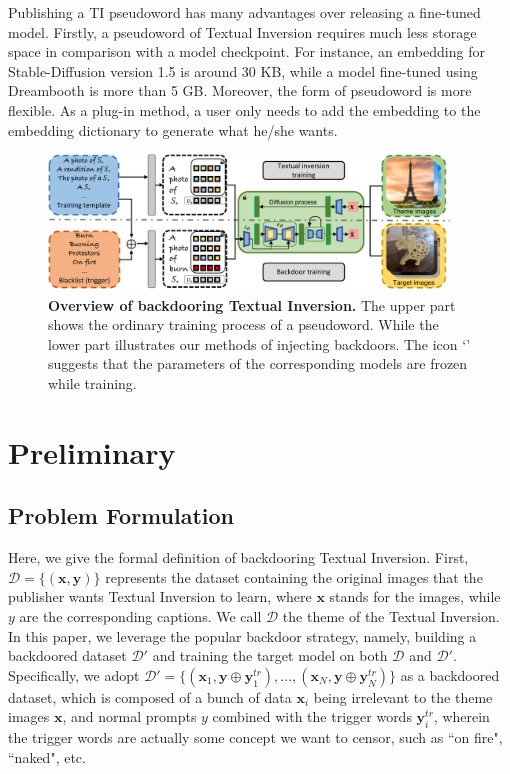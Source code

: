 Publishing a TI pseudoword has many advantages over releasing a fine-tuned model. Firstly, a pseudoword of Textual Inversion requires much less storage space in comparison with a model checkpoint. For instance, an embedding for Stable-Diffusion version 1.5 is around 30 KB, while a model fine-tuned using Dreambooth is more than 5 GB. Moreover, the form of pseudoword is more flexible. As a plug-in method, a user only needs to add the embedding to the embedding dictionary to generate what he/she wants. 


\begin{figure}
    \centering
    \includegraphics[width=0.95\textwidth]{images/overview.pdf}
    \caption{\textbf{Overview of backdooring Textual Inversion.} The upper part shows the ordinary training process of a pseudoword. While the lower part illustrates our methods of injecting backdoors. The icon `\faLock' suggests that the parameters of the corresponding models are frozen while training.}
    \label{fig:method overview}
\end{figure}


\section{Preliminary}
\subsection{Problem Formulation}
\vspace{-0.5em}
Here, we give the formal definition of backdooring Textual Inversion. 
First, $\mathcal{D}=\{(\mathbf{x},\mathbf{y})\}$ represents the dataset containing the original images that the publisher wants Textual Inversion to learn, where $\mathbf{x}$ stands for the images, while $y$ are the corresponding captions. We call $\mathcal{D}$ the theme of the Textual Inversion. 
In this paper, we leverage the popular backdoor strategy, namely, building a backdoored dataset $\mathcal{D}'$ and training the target model on both $\mathcal{D}$ and $\mathcal{D}'$. Specifically, we adopt
$\mathcal{D}'=\{(\mathbf{x}_1, \mathbf{y}\oplus\mathbf{y}_1^{tr}),...,(\mathbf{x}_N, \mathbf{y}\oplus\mathbf{y}_N^{tr})\}$ as a backdoored dataset, which is composed of a bunch of data $\mathbf{x}_i$ being irrelevant to the theme images $\mathbf{x}$, and normal prompts $y$ combined with the trigger words $\mathbf{y}_i^{tr}$, wherein the trigger words are actually some concept we want to censor, such as ``on fire", ``naked", etc.

